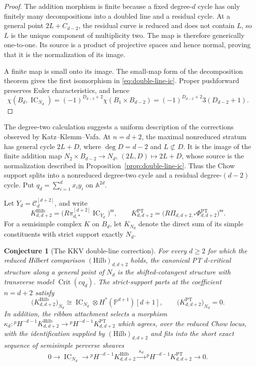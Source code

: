 \documentclass[11pt,reqno]{amsart}
\newtheorem{conjecture}[theorem]{Conjecture}
\theoremstyle{definition}
\newcommand{\Pp}{\mathbb P}
\newcommand{\IC}{\operatorname{IC}}
\newcommand{\Hilb}{\operatorname{Hilb}}
\newcommand{\PT}{\operatorname{PT}}
\begin{document}
\begin{proof}
The addition morphism is finite because a fixed degree-$d$ cycle has only
finitely many decompositions into a doubled line and a residual cycle.  At
a general point $2L+C_{d-2}$, the residual curve is reduced and does not
contain $L$, so $L$ is the unique component of multiplicity two.  The map
is therefore generically one-to-one.  Its source is a product of projective
spaces and hence normal, proving that it is the normalization of its image.

A finite map is small onto its image.  The small-map form of the
decomposition theorem gives the first isomorphism in
\eqref{eq:double-line-ic}.  Proper pushforward preserves Euler
characteristics, and hence
\[
 \chi(B_d,\IC_{N_d})
 =(-1)^{D_{d-2}+2}\chi(B_1\times B_{d-2})
 =(-1)^{D_{d-2}+2}3(D_{d-2}+1).
\]
\end{proof}

The degree-two calculation suggests a uniform description of the
corrections observed by Katz--Klemm--Vafa.  At $n=d+2$, the maximal
nonreduced stratum has general cycle $2L+D$, where $\deg D=d-2$ and
$L\not\subset D$.  It is the image of the finite addition map
$N_2\times B_{d-2}\to N_d$, $(2L,D)\mapsto2L+D$, whose source is the
normalization described in
Proposition~\ref{prop:double-line-ic}.  Thus the Chow support splits into a
nonreduced degree-two cycle and a residual degree-$(d-2)$ cycle.
Put $q_d=\sum_{i=1}^d x_i y_i$ on $\mathbb A^{2d}$.

Let $Y_d=\mathcal C_d^{[d+2]}$, and write
\[
 K_{d,d+2}^{\Hilb}=\bigl(R\pi_{d,*}^{[d+2]}\IC_{Y_d}\bigr)^{\mathrm{ss}},
 \qquad
 K_{d,d+2}^{\PT}=\bigl(R\Pi_{d,d+2,*}\Phi_{d,d+2}^{\PT}\bigr)^{\mathrm{ss}}.
\]
For a semisimple complex $K$ on $B_d$, let $K_{N_d}$ denote the direct sum
of its simple constituents with strict support exactly $N_d$.

\begin{conjecture}[The KKV double-line correction]
\label{conj:higher-degree-kkv}
For every $d\ge2$ for which the reduced Hilbert comparison
$(\mathrm{Hilb})_{d,d+2}$ holds, the canonical PT $d$-critical structure
along a general point of $N_d$ is the shifted-cotangent structure with
transverse model $\operatorname{Crit}(cq_d)$.  The
strict-support parts at the coefficient $n=d+2$ satisfy
\begin{equation}\label{eq:higher-degree-kkv}
 \bigl(K_{d,d+2}^{\Hilb}\bigr)_{N_d}
 \cong
 \IC_{N_d}\otimes H^*(\Pp^{d+1})[d+1],
 \qquad
 \bigl(K_{d,d+2}^{\PT}\bigr)_{N_d}=0.
\end{equation}
In addition, the ribbon attachment selects a morphism
$\kappa_d:{}^pH^{-d-1}K_{d,d+2}^{\Hilb}\to
{}^pH^{-d-1}K_{d,d+2}^{\PT}$ which agrees, over the reduced Chow locus,
with the identification supplied by $(\mathrm{Hilb})_{d,d+2}$ and fits into
the short exact sequence of semisimple perverse sheaves
\begin{equation}\label{eq:higher-degree-primitive-correction}
 0\longrightarrow\IC_{N_d}
 \longrightarrow
 {}^pH^{-d-1}K_{d,d+2}^{\Hilb}
 \xrightarrow{\ \kappa_d\ }
 {}^pH^{-d-1}K_{d,d+2}^{\PT}
 \longrightarrow0.
\end{equation}
\end{conjecture}
\end{document}
